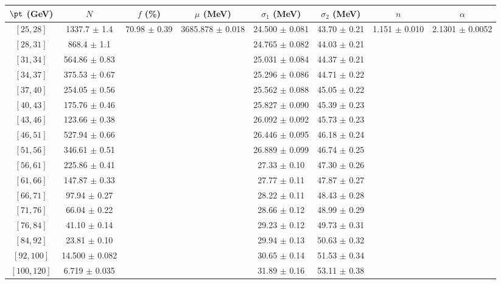 \begin{tabular}{c||c|c|c|c|c|c|c}
$\pt$ (GeV) & $N$ & $f$ (\%) & $\mu$ (MeV) & $\sigma_1$ (MeV) & $\sigma_2$ (MeV) & $n$ & $\alpha$ \\
\hline
$[25, 28]$ & 1337.7 $\pm$ 1.4 & \multirow{17}{*}{70.98 $\pm$ 0.39} & \multirow{17}{*}{3685.878 $\pm$ 0.018} & 24.500 $\pm$ 0.081 & 43.70 $\pm$ 0.21 & \multirow{17}{*}{1.151 $\pm$ 0.010} & \multirow{17}{*}{2.1301 $\pm$ 0.0052}\\
$[28, 31]$ & 868.4 $\pm$ 1.1 &  &  & 24.765 $\pm$ 0.082 & 44.03 $\pm$ 0.21 &  & \\
$[31, 34]$ & 564.86 $\pm$ 0.83 &  &  & 25.031 $\pm$ 0.084 & 44.37 $\pm$ 0.21 &  & \\
$[34, 37]$ & 375.53 $\pm$ 0.67 &  &  & 25.296 $\pm$ 0.086 & 44.71 $\pm$ 0.22 &  & \\
$[37, 40]$ & 254.05 $\pm$ 0.56 &  &  & 25.562 $\pm$ 0.088 & 45.05 $\pm$ 0.22 &  & \\
$[40, 43]$ & 175.76 $\pm$ 0.46 &  &  & 25.827 $\pm$ 0.090 & 45.39 $\pm$ 0.23 &  & \\
$[43, 46]$ & 123.66 $\pm$ 0.38 &  &  & 26.092 $\pm$ 0.092 & 45.73 $\pm$ 0.23 &  & \\
$[46, 51]$ & 527.94 $\pm$ 0.66 &  &  & 26.446 $\pm$ 0.095 & 46.18 $\pm$ 0.24 &  & \\
$[51, 56]$ & 346.61 $\pm$ 0.51 &  &  & 26.889 $\pm$ 0.099 & 46.74 $\pm$ 0.25 &  & \\
$[56, 61]$ & 225.86 $\pm$ 0.41 &  &  & 27.33 $\pm$ 0.10 & 47.30 $\pm$ 0.26 &  & \\
$[61, 66]$ & 147.87 $\pm$ 0.33 &  &  & 27.77 $\pm$ 0.11 & 47.87 $\pm$ 0.27 &  & \\
$[66, 71]$ & 97.94 $\pm$ 0.27 &  &  & 28.22 $\pm$ 0.11 & 48.43 $\pm$ 0.28 &  & \\
$[71, 76]$ & 66.04 $\pm$ 0.22 &  &  & 28.66 $\pm$ 0.12 & 48.99 $\pm$ 0.29 &  & \\
$[76, 84]$ & 41.10 $\pm$ 0.14 &  &  & 29.23 $\pm$ 0.12 & 49.73 $\pm$ 0.31 &  & \\
$[84, 92]$ & 23.81 $\pm$ 0.10 &  &  & 29.94 $\pm$ 0.13 & 50.63 $\pm$ 0.32 &  & \\
$[92, 100]$ & 14.500 $\pm$ 0.082 &  &  & 30.65 $\pm$ 0.14 & 51.53 $\pm$ 0.34 &  & \\
$[100, 120]$ & 6.719 $\pm$ 0.035 &  &  & 31.89 $\pm$ 0.16 & 53.11 $\pm$ 0.38 &  & \\
\end{tabular}
